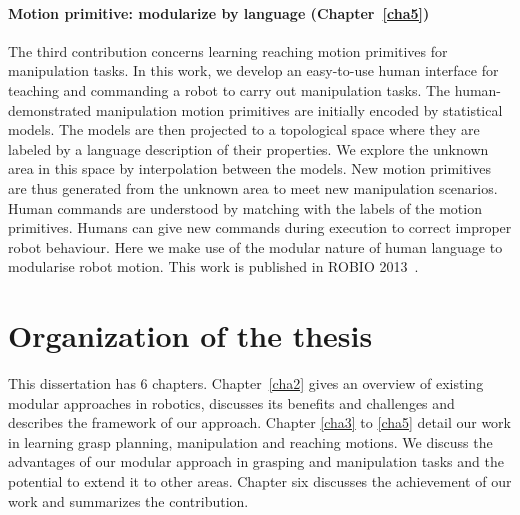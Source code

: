 \paragraph{Motion primitive: modularize by language (Chapter~\ref{cha5})}
The third contribution concerns learning reaching motion primitives for manipulation tasks. In this work, we develop an easy-to-use human interface for teaching and commanding a robot to carry out manipulation tasks. The human-demonstrated manipulation motion primitives are initially encoded by statistical models. The models are then projected to a topological space where they are labeled by a language description of their properties. We explore the unknown area in this space by interpolation between the models. New motion primitives are thus generated from the unknown area to meet new manipulation scenarios.
Human commands are understood by matching with the labels of the motion primitives. Humans can give new commands during execution to correct improper robot behaviour. Here we make use of the modular nature of human language to modularise robot motion. This work is published in ROBIO 2013~\citep{bidan2013robio}.






\section{Organization of the thesis}
\label{cha1:organization}
This dissertation has 6 chapters. Chapter~\ref{cha2} gives an overview of existing modular approaches in robotics, discusses its benefits and challenges and describes the framework of our approach. Chapter \ref{cha3} to \ref{cha5} detail our work in learning grasp planning, manipulation and reaching motions. We discuss the advantages of our modular approach in grasping and manipulation tasks and the potential to extend it to other areas. Chapter six discusses the achievement of our work and summarizes the contribution.


